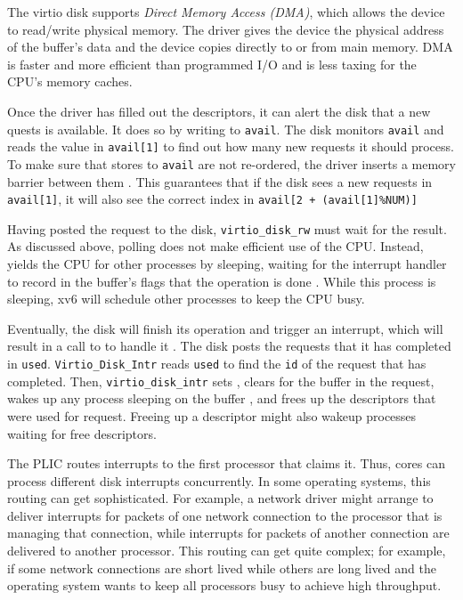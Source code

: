 The virtio disk supports \textit{Direct Memory Access
  (DMA)}, which allows the device to read/write physical
memory.  The driver gives the device the physical address of the
buffer's data  and the device
copies directly to or from main memory.  DMA is faster and more
efficient than programmed I/O and is less taxing for the CPU's memory
caches.

Once the driver has filled out the descriptors, it can alert the disk
that a new quests is available.  It does so by writing to
\lstinline{avail}.  The disk monitors \lstinline{avail} and reads the
value in \lstinline{avail[1]} to find out how many new requests it
should process.  To make sure that stores to \lstinline{avail} are not
re-ordered, the driver inserts a memory barrier between them
. This guarantees
that if the disk sees a new requests in \lstinline{avail[1]}, it will
also see the correct index in \lstinline{avail[2 + (avail[1]%NUM)]}

Having posted the request to the disk,
\lstinline{virtio_disk_rw}
must wait for the result.  As discussed above,
polling does not make efficient use of the CPU.
Instead,
yields the CPU for other processes by sleeping,
waiting for the interrupt handler to 
record in the buffer's flags that the operation is done
.
While this process is sleeping,
xv6 will schedule other processes to keep the CPU busy.

Eventually, the disk will finish its operation and trigger an
interrupt, which will result in a call to
to handle it
.
The disk posts the requests that it has completed in \lstinline{used}.
\lstinline{Virtio_Disk_Intr}
reads \lstinline{used} to find the \lstinline{id} of
the request that has completed.
Then, \lstinline{virtio_disk_intr}
sets 
,
clears
 for the buffer in the request,
wakes up any process sleeping on the buffer
,
and frees up the descriptors that were used for request.
Freeing up a descriptor might also wakeup processes
waiting for free descriptors.

The PLIC routes interrupts to the first processor that claims it.
Thus, cores can process different disk interrupts concurrently.  In
some operating systems, this routing can get sophisticated.  For
example, a network driver might arrange to deliver interrupts for
packets of one network connection to the processor that is managing
that connection, while interrupts for packets of another connection
are delivered to another processor.  This routing can get quite
complex; for example, if some network connections are short lived
while others are long lived and the operating system wants to keep all
processors busy to achieve high throughput.

